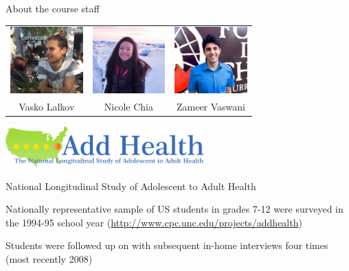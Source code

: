 \documentclass{beamer}
\begin{document}
\begin{darkframes}
\begin{frame}{About the course staff}
\begin{itemize}
          \vspace{0.2in}
          \begin{center}
            \begin{tabular}{ccc}
              \includegraphics[width=1.1in]{vasko} &
              \includegraphics[width=1.1in]{nicole} &
              \includegraphics[width=1.1in]{zameer} \\
              Vasko Lalkov & Nicole Chia & Zameer Vaswani \\
            \end{tabular}
          \end{center}
      \end{itemize}
    \end{frame}

    \begin{frame}
      \begin{center}
        \includegraphics[width=3in]{add-health}

        \bigskip
        National Longitudinal Study of Adolescent to Adult Health

        \bigskip
        Nationally representative sample of US students in grades 7-12 were surveyed in the 1994-95 school year (\url{http://www.cpc.unc.edu/projects/addhealth})

        \bigskip
        Students were followed up on with subsequent in-home interviews four times (most recently 2008)
      \end{center}
    \end{frame}


\end{darkframes}
\end{document}
